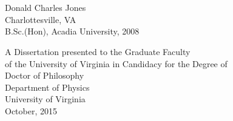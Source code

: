 \documentclass[11pt, twoside]{Thesis} %
\title{\ttitle} %
\begin{document}
\setlength{\unitlength}{1mm}

\frontmatter %


\fancyhead{} %
\rhead{\thepage} %
\lhead{} %

\pagestyle{fancy} %

\newcommand{\HRule}{\rule{\linewidth}{0.5mm}} %

\hypersetup{pdfsubject=\subjectname}
\hypersetup{pdfauthor=\authornames}
\hypersetup{pdfkeywords=\keywordnames}


\begin{titlepage}
\begin{center}

~\\\vspace{1.4cm}
{\Large \bfseries \ttitle}\\[0.4cm] %
\vspace{1.6cm}
{\large Donald Charles Jones\\
Charlottesville, VA
\vspace{1.5cm} \\
B.Sc.(Hon), Acadia University, 2008}
\vspace{2.6cm}
 
{\large A Dissertation presented to the Graduate Faculty\\
of the University of Virginia in Candidacy for the Degree of\\ Doctor of Philosophy\\ %
\vspace{1cm}
\large Department of Physics}\\[1cm]

{\large University of Virginia\\ 
October, 2015}\\[4cm] %
 
\vfill
\end{center}

\end{titlepage}
\end{document}
